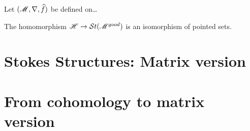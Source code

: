 Let $(\mathscr{M},\nabla,\widehat f)$ be defined on\dots

\begin{thm}
  The homomorphism $\mathscr{H}\to\mathcal{S}{}t(\mathscr{M}^{good})$ is an isomorphism of pointed sets.
\end{thm}



\section{Stokes Structures: Matrix version}
\section{From cohomology to matrix version}
